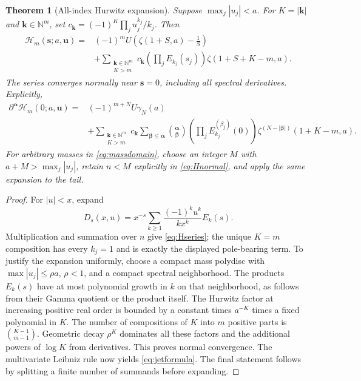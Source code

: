 \documentclass[11pt]{article}
\numberwithin{equation}{section}
\newtheorem{theorem}{Theorem}[section]
\theoremstyle{definition}\newtheorem{definition}[theorem]{Definition}
\theoremstyle{remark}\newtheorem{remark}[theorem]{Remark}
\newcommand{\N}{\mathbb N}
\newcommand{\bs}{\boldsymbol{s}}
\newcommand{\bu}{\boldsymbol{u}}
\newcommand{\ba}{\boldsymbol{\alpha}}
\newcommand{\bb}{\boldsymbol{\beta}}
\newcommand{\bk}{\boldsymbol{k}}
\newcommand{\cH}{\mathcal H}
\begin{document}
\begin{theorem}[All-index Hurwitz expansion]\label{thm:zetajets}
Suppose $\max_j|u_j|<a$. For $K=|\bk|$ and $\bk\in\N^m$, set
$c_{\bk}=(-1)^K\prod_j u_j^{k_j}/k_j$. Then
\begin{align}\label{eq:Hseries}
 \cH_m(\bs;a,\bu)
 ={}&(-1)^mU\left(\zeta(1+S,a)-\frac1S\right)\\
 &+\sum_{\substack{\bk\in\N^m\\K>m}}
 c_{\bk}\left(\prod_jE_{k_j}(s_j)\right)
 \zeta(1+S+K-m,a).\nonumber
\end{align}
The series converges normally near $\bs=0$, including all spectral derivatives. Explicitly,
\begin{align}\label{eq:jetformula}
 \partial^{\ba}\cH_m(0;a,\bu)
 ={}&(-1)^{m+N}U\gamma_N(a)\\
 &+\sum_{\substack{\bk\in\N^m\\K>m}}c_{\bk}
 \sum_{\bb\le\ba}\binom{\ba}{\bb}
 \left(\prod_jE_{k_j}^{(\beta_j)}(0)\right)
 \zeta^{(N-|\bb|)}(1+K-m,a).\nonumber
\end{align}
For arbitrary masses in \eqref{eq:massdomain}, choose an integer $M$ with $a+M>\max_j|u_j|$, retain $n<M$ explicitly in \eqref{eq:Hnormal}, and apply the same expansion to the tail.
\end{theorem}
\begin{proof}
For $|u|<x$, expand
\[
 D_s(x,u)=x^{-s}\sum_{k\ge1}\frac{(-1)^ku^k}{k x^k}E_k(s).
\]
Multiplication and summation over $n$ give \eqref{eq:Hseries}; the unique $K=m$ composition has every $k_j=1$ and is exactly the displayed pole-bearing term. To justify the expansion uniformly, choose a compact mass polydisc with $\max |u_j|\le\rho a$, $\rho<1$, and a compact spectral neighborhood. The products $E_k(s)$ have at most polynomial growth in $k$ on that neighborhood, as follows from their Gamma quotient or the product itself. The Hurwitz factor at increasing positive real order is bounded by a constant times $a^{-K}$ times a fixed polynomial in $K$. The number of compositions of $K$ into $m$ positive parts is $\binom{K-1}{m-1}$. Geometric decay $\rho^K$ dominates all these factors and the additional powers of $\log K$ from derivatives. This proves normal convergence. The multivariate Leibniz rule now yields \eqref{eq:jetformula}. The final statement follows by splitting a finite number of summands before expanding.
\end{proof}
\end{document}
